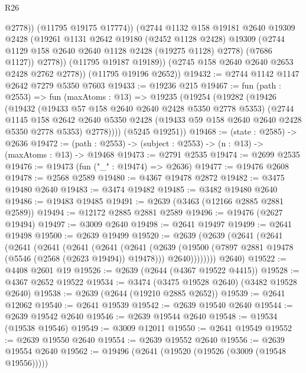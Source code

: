 \begin{lexlean}{R26}
\begin{coremodule}
                  @2778))
              (@11795 @19175 @17774))
            (@2744
              @1132
              @158
              @19181
              @2640
              @19309
              @2428
              (@19261
                @1131
                @2642
                @19180
                (@2452 @1128 @2428)
                @19309
                (@2744 @1129 @158 @2640 @2640 @1128 @2428 (@19275 @1128) @2778)
                (@7686 @1127))
              @2778))
          (@11795 @19187 @19189))
        (@2745 @158 @2640 @2640 @2653 @2428 @2762 @2778))
      (@11795 @19196 @2652))
@19432 := @2744 @1142 @1147 @2642 @7279 @5350 @7603
@19433 := @19236 @215
@19467 := fun (path : @2553) =>
  fun (maxAtoms : @13) =>
  @19235
    (@19254
      (@19282
        (@19426
          (@19432
            (@19433 @57 @158 @2640 @2640 @2428 @5350 @2778 @5353)
            (@2744
              @1145
              @158
              @2642
              @2640
              @5350
              @2428
              (@19433 @59 @158 @2640 @2640 @2428 @5350 @2778 @5353)
              @2778))))
      (@5245 @19251))
@19468 := (state : @2585) -> @2636
@19472 := (path : @2553) -> (subject : @2553) -> (n : @13) -> (maxAtoms : @13) -> @19468
@19473 := @2791 @2535
@19474 := @2699 @2535
@19476 := @19473 (fun ("_" : @19474) => @2636)
@19477 := @19476 @2608
@19478 := @2568 @2589
@19480 := @4367 @19478 @2872
@19482 := @3475 @19480 @2640
@19483 := @3474 @19482
@19485 := @3482 @19480 @2640
@19486 := @19483 @19485
@19491 := @2639 (@3463 (@12166 @2885 @2881 @2589))
@19494 := @12172 @2885 @2881 @2589
@19496 := @19476 (@2627 @19494)
@19497 := @3009 @2640
@19498 := @2641 @19497
@19499 := @2641 @19498
@19500 := @2639 @19499
@19520 := @2639
    (@2639
      (@2641
        (@2641
          (@2641
            (@2641
              (@2641
                (@2641
                  (@2641
                    (@2639
                      (@19500 (@7897 @2881 @19478 (@5546 (@2568 (@2623 @19494)) @19478)))
                      @2640))))))))
      @2640)
@19522 := @4408 @2601 @19
@19526 := @2639 (@2644 (@4367 @19522 @4415))
@19528 := @4367 @2652 @19522
@19534 := @3474 (@3475 @19528 @2640) (@3482 @19528 @2640)
@19538 := @2639 (@2644 (@19210 @2885 @2652))
@19539 := @2641 @12062
@19540 := @2641 @19539
@19542 := @2639 @19540 @2640
@19544 := @2639 @19542 @2640
@19546 := @2639 @19544 @2640
@19548 := @19534 (@19538 @19546)
@19549 := @3009 @12011
@19550 := @2641 @19549
@19552 := @2639 @19550 @2640
@19554 := @2639 @19552 @2640
@19556 := @2639 @19554 @2640
@19562 := @19496 (@2641 (@19520 (@19526 (@3009 (@19548 @19556)))))

\end{coremodule}
\end{lexlean}
